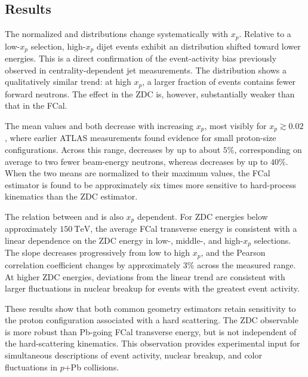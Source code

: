 \subsection{Results}

The normalized \ETPB and \EZDC distributions change systematically with $x_p$.
Relative to a low-$x_p$ selection, high-$x_p$ dijet events exhibit an \ETPB
distribution shifted toward lower energies. This is a direct confirmation of
the event-activity bias previously observed in centrality-dependent jet
measurements. The \EZDC distribution shows a qualitatively similar trend: at
high $x_p$, a larger fraction of events contains fewer forward neutrons. The
effect in the ZDC is, however, substantially weaker than that in the FCal.

The mean values \AZDC and \EATPB both decrease with increasing $x_p$, most
visibly for $x_p\gtrsim 0.02$, where earlier ATLAS measurements found evidence
for small proton-size configurations. Across this range, \AZDC decreases by up
to about $5\%$, corresponding on average to two fewer beam-energy neutrons,
whereas \EATPB decreases by up to $40\%$. When the two means are normalized to
their maximum values, the FCal estimator is found to be approximately six times
more sensitive to hard-process kinematics than the ZDC estimator.

The relation between \ETPB and \EZDC is also $x_p$ dependent. For ZDC energies
below approximately $150~\mathrm{TeV}$, the average FCal transverse energy is
consistent with a linear dependence on the ZDC energy in low-, middle-, and
high-$x_p$ selections. The slope decreases progressively from low to high
$x_p$, and the Pearson correlation coefficient changes by approximately $3\%$
across the measured range. At higher ZDC energies, deviations from the linear
trend are consistent with larger fluctuations in nuclear breakup for events
with the greatest event activity.

These results show that both common geometry estimators retain sensitivity to
the proton configuration associated with a hard scattering. The ZDC observable
is more robust than Pb-going FCal transverse energy, but is not independent of
the hard-scattering kinematics. This observation provides experimental input
for simultaneous descriptions of event activity, nuclear breakup, and color
fluctuations in $p$+Pb collisions.
